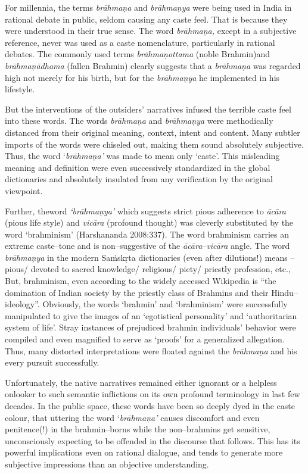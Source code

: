 For millennia, the terms \textit{brāhmaṇa} and \textit{brāhmaṇya} were being used in India in rational debate in public, seldom causing any caste feel. That is because they were understood in their true sense. The word \textit{brāhmaṇa,} except in a subjective reference, never was used as a caste nomenclature, particularly in rational debates. The commonly used terms \textit{brāhmaṇottama} (noble Brahmin)and \textit{brāhmaṇādhama} (fallen Brahmin) clearly suggests that a \textit{brāhmaṇa} was regarded high not merely for his birth, but for the \textit{brāhmaṇya} he implemented in his lifestyle.

But the interventions of the outsiders’ narratives infused the terrible caste feel into these words. The words \textit{brāhmaṇa} and \textit{brāhmaṇya} were methodically distanced from their original meaning, context, intent and content. Many subtler imports of the words were chiseled out, making them sound absolutely subjective. Thus, the word ‘\textit{brāhmaṇa’} was made to mean only ‘caste’. This misleading meaning and definition were even successively standardized in the global dictionaries and absolutely insulated from any verification by the original viewpoint.

Further\textit{,} theword\textit{ ‘brāhmaṇya’} which suggests strict pious adherence to \textit{ācāra} (pious life style) and \textit{vicāra} (profound thought) was cleverly substituted by the word ‘brahminism’ (Harshananda 2008:337). The word brahminism carries an extreme caste–tone and is non–suggestive of the \textit{ācāra}–\textit{vicāra} angle. The word \textit{brāhmaṇya} in the modern Saṁskṛta dictionaries (even after dilutions!) means – pious/ devoted to sacred knowledge/ religious/ piety/ priestly profession, etc., But, brahminism, even according to the widely accessed Wikipedia is “the domination of Indian society by the priestly class of Brahmins and their Hindu–ideology”. Obviously, the words ‘brahmin’ and ‘brahminism’ were successfully manipulated to give the images of an ‘egotistical personality’ and ‘authoritarian system of life’. Stray instances of prejudiced brahmin individuals’ behavior were compiled and even magnified to serve as ‘proofs’ for a generalized allegation. Thus, many distorted interpretations were floated against the \textit{brāhmaṇa} and his every pursuit successfully.

Unfortunately, the native narratives remained either ignorant or a helpless onlooker to such semantic inflictions on its own profound terminology in last few decades. In the public space, these words have been so deeply dyed in the caste colour, that uttering the word ‘\textit{brāhmaṇa’} causes discomfort and even penitence(!) in the brahmin–borns while the non–brahmins get sensitive, unconsciously expecting to be offended in the discourse that follows. This has its powerful implications even on rational dialogue, and tends to generate more subjective impressions than an objective understanding.

